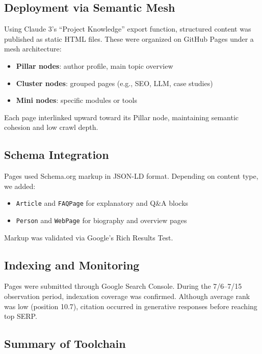 \subsection{Deployment via Semantic Mesh}

Using Claude 3’s “Project Knowledge” export function, structured content was published as static HTML files. These were organized on GitHub Pages under a mesh architecture:
\begin{itemize}
  \item \textbf{Pillar nodes}: author profile, main topic overview
  \item \textbf{Cluster nodes}: grouped pages (e.g., SEO, LLM, case studies)
  \item \textbf{Mini nodes}: specific modules or tools
\end{itemize}
Each page interlinked upward toward its Pillar node, maintaining semantic cohesion and low crawl depth.

\subsection{Schema Integration}

Pages used Schema.org markup in JSON-LD format. Depending on content type, we added:
\begin{itemize}
  \item \texttt{Article} and \texttt{FAQPage} for explanatory and Q\&A blocks
  \item \texttt{Person} and \texttt{WebPage} for biography and overview pages
\end{itemize}
Markup was validated via Google’s Rich Results Test.

\subsection{Indexing and Monitoring}

Pages were submitted through Google Search Console. During the 7/6--7/15 observation period, indexation coverage was confirmed. Although average rank was low (position 10.7), citation occurred in generative responses before reaching top SERP.

\subsection{Summary of Toolchain}

